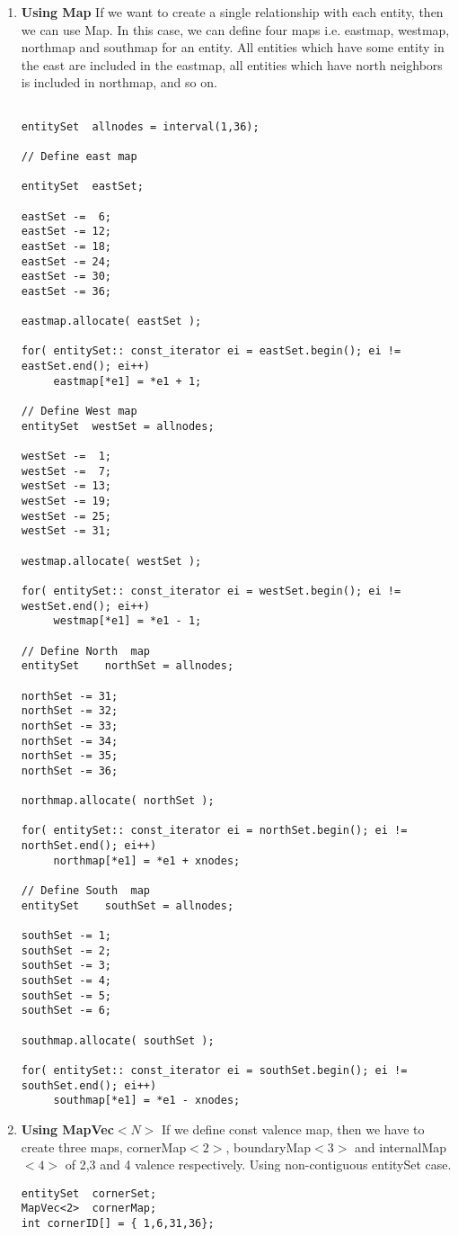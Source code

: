 \begin{enumerate}
\item { \bf Using Map }   If we want to create a single relationship with 
each entity, then we can use Map. In this case, we can define four maps
i.e. eastmap, westmap, northmap and southmap for an entity. All entities
which have some entity in the east are included  in the eastmap, all
entities which have north neighbors is included in northmap, and so on.

\begin{verbatim}

entitySet  allnodes = interval(1,36);

// Define east map

entitySet  eastSet;

eastSet -=  6;
eastSet -= 12;
eastSet -= 18;
eastSet -= 24;
eastSet -= 30;
eastSet -= 36;

eastmap.allocate( eastSet );

for( entitySet:: const_iterator ei = eastSet.begin(); ei != eastSet.end(); ei++)
     eastmap[*e1] = *e1 + 1;

// Define West map
entitySet  westSet = allnodes;

westSet -=  1;
westSet -=  7;
westSet -= 13;
westSet -= 19;
westSet -= 25;
westSet -= 31;

westmap.allocate( westSet );

for( entitySet:: const_iterator ei = westSet.begin(); ei != westSet.end(); ei++)
     westmap[*e1] = *e1 - 1;

// Define North  map
entitySet    northSet = allnodes;

northSet -= 31;
northSet -= 32;
northSet -= 33;
northSet -= 34;
northSet -= 35;
northSet -= 36;

northmap.allocate( northSet );

for( entitySet:: const_iterator ei = northSet.begin(); ei != northSet.end(); ei++)
     northmap[*e1] = *e1 + xnodes;

// Define South  map
entitySet    southSet = allnodes;

southSet -= 1;
southSet -= 2;
southSet -= 3;
southSet -= 4;
southSet -= 5;
southSet -= 6;

southmap.allocate( southSet );

for( entitySet:: const_iterator ei = southSet.begin(); ei != southSet.end(); ei++)
     southmap[*e1] = *e1 - xnodes;

\end{verbatim}
%
\item {\bf Using MapVec$<N>$ }  If we define const valence map, then we have to 
create three maps, cornerMap$<2>$, boundaryMap$<3>$ and internalMap$<4>$ of 2,3 and
4 valence respectively.  Using non-contiguous entitySet case.
\begin{verbatim}
entitySet  cornerSet;
MapVec<2>  cornerMap;
int cornerID[] = { 1,6,31,36};


\end{verbatim}
\end{enumerate}
